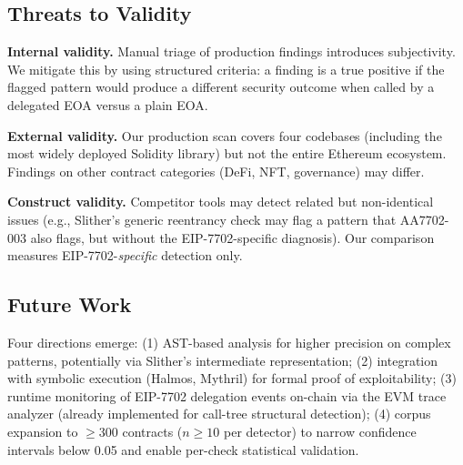 \subsection{Threats to Validity}

\textbf{Internal validity.} Manual triage of production findings introduces subjectivity. We mitigate this by using structured criteria: a finding is a true positive if the flagged pattern would produce a different security outcome when called by a delegated EOA versus a plain EOA.

\textbf{External validity.} Our production scan covers four codebases (including the most widely deployed Solidity library) but not the entire Ethereum ecosystem. Findings on other contract categories (DeFi, NFT, governance) may differ.

\textbf{Construct validity.} Competitor tools may detect related but non-identical issues (e.g., Slither's generic reentrancy check may flag a pattern that AA7702-003 also flags, but without the EIP-7702-specific diagnosis). Our comparison measures EIP-7702-\textit{specific} detection only.

\subsection{Future Work}

Four directions emerge: (1) AST-based analysis for higher precision on complex patterns, potentially via Slither's intermediate representation; (2) integration with symbolic execution (Halmos, Mythril) for formal proof of exploitability; (3) runtime monitoring of EIP-7702 delegation events on-chain via the EVM trace analyzer (already implemented for call-tree structural detection); (4) corpus expansion to $\geq$300 contracts ($n \geq 10$ per detector) to narrow confidence intervals below 0.05 and enable per-check statistical validation.
